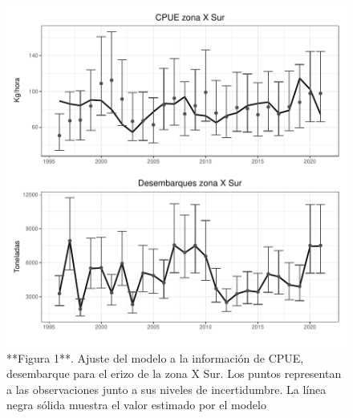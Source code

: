 \documentclass[
]{article}
\begin{document}
\begin{figure}

{\centering \includegraphics{Figuras/Fig_ajustesIndices_XS-1} 

}

\caption{**Figura 1**. Ajuste del modelo a la información de CPUE, desembarque para el erizo de la zona X Sur. Los puntos representan a las observaciones junto a sus niveles de incertidumbre. La línea negra sólida muestra el valor estimado por el modelo}\label{fig:Fig_ajustesIndices_XS}
\end{figure}
\end{document}
